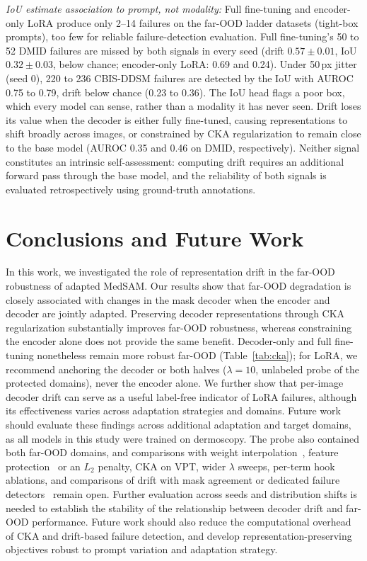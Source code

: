 \documentclass[runningheads]{llncs}
\begin{document}
\emph{IoU estimate association to prompt, not modality:} Full fine-tuning and encoder-only LoRA produce only 2--14 failures on the far-OOD ladder datasets (tight-box prompts), too few for reliable failure-detection evaluation. Full fine-tuning's 50 to 52 DMID failures are missed by both signals in every seed (drift $0.57 \pm 0.01$, IoU $0.32 \pm 0.03$, below chance; encoder-only LoRA: 0.69 and 0.24). Under 50\,px jitter (seed 0), 220 to 236 CBIS-DDSM failures are detected by the IoU with AUROC 0.75 to 0.79, drift below chance (0.23 to 0.36). The IoU head flags a poor box, which every model can sense, rather than a modality it has never seen. Drift loses its value when the decoder is either fully fine-tuned, causing representations to shift broadly across images, or constrained by CKA regularization to remain close to the base model (AUROC 0.35 and 0.46 on DMID, respectively). Neither signal constitutes an intrinsic self-assessment: computing drift requires an additional forward pass through the base model, and the reliability of both signals is evaluated retrospectively using ground-truth annotations.

\section{Conclusions and Future Work}
\label{sec:conclusion}

In this work, we investigated the role of representation drift in the far-OOD robustness of adapted MedSAM. Our results show that far-OOD degradation is closely associated with changes in the mask decoder when the encoder and decoder are jointly adapted. Preserving decoder representations through CKA regularization substantially improves far-OOD robustness, whereas constraining the encoder alone does not provide the same benefit. Decoder-only and full fine-tuning nonetheless remain more robust far-OOD (Table~\ref{tab:cka}); for LoRA, we recommend anchoring the decoder or both halves ($\lambda = 10$, unlabeled probe of the protected domains), never the encoder alone. We further show that per-image decoder drift can serve as a useful label-free indicator of LoRA failures, although its effectiveness varies across adaptation strategies and domains. Future work should evaluate these findings across additional adaptation and target domains, as all models in this study were trained on dermoscopy. The probe also contained both far-OOD domains, and comparisons with weight interpolation~\cite{wortsman2022wiseft}, feature protection~\cite{tan2024protection} or an $L_2$ penalty, CKA on VPT, wider $\lambda$ sweeps, per-term hook ablations, and comparisons of drift with mask agreement or dedicated failure detectors~\cite{zenk2024failure,kinalioglu2026consistency} remain open. Further evaluation across seeds and distribution shifts is needed to establish the stability of the relationship between decoder drift and far-OOD performance. Future work should also reduce the computational overhead of CKA and drift-based failure detection, and develop representation-preserving objectives robust to prompt variation and adaptation strategy.



\end{document}
